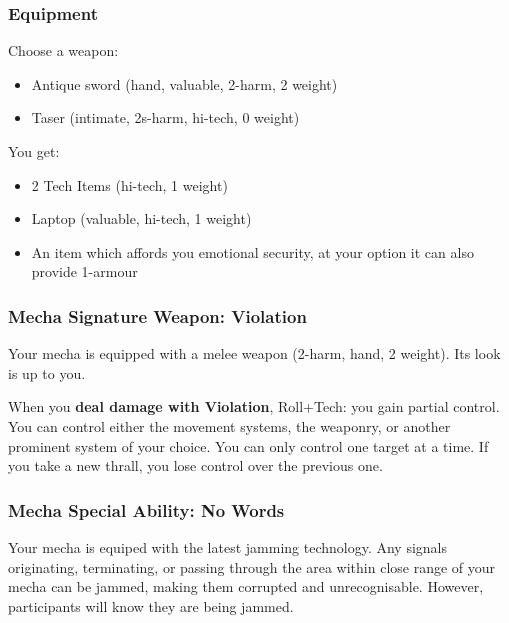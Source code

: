 
\subsubsection{Equipment}
Choose a weapon:
\begin{itemize}
\item Antique sword (hand, valuable, 2-harm, 2 weight)
\item Taser (intimate, 2s-harm, hi-tech, 0 weight)
\end{itemize}

You get:
\begin{itemize}
\item 2 Tech Items (hi-tech, 1 weight)
\item Laptop (valuable, hi-tech, 1 weight)
\item An item which affords you emotional security, at your option it can also provide 1-armour
\end{itemize}

\subsubsection{Mecha Signature Weapon: Violation}
Your mecha is equipped with a melee weapon (2-harm, hand, 2 weight). Its look is up to you.

When you \textbf{deal damage with Violation}, Roll+Tech:
{you gain partial control. You can control either the movement systems, the weaponry, or another prominent system of your choice.}
You can only control one target at a time. If you take a new thrall, you lose control over the previous one.

\subsubsection{Mecha Special Ability: No Words}
Your mecha is equiped with the latest jamming technology. Any signals originating, terminating, or passing through the area within close range of your mecha can be jammed, making them corrupted and unrecognisable. However, participants will know they are being jammed.



